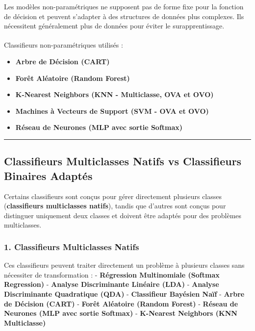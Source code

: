 \documentclass[
  letterpaper,
  DIV=11,
  numbers=noendperiod]{scrartcl}
\makeatletter
\let\oldparagraph\paragraph
\renewcommand{\paragraph}{
    \@ifstar
      \xxxParagraphStar
      \xxxParagraphNoStar
  }
\newcommand{\xxxParagraphStar}[1]{\oldparagraph*{#1}\mbox{}}
\newcommand{\xxxParagraphNoStar}[1]{\oldparagraph{#1}\mbox{}}
\providecommand{\tightlist}{%
  \setlength{\itemsep}{0pt}\setlength{\parskip}{0pt}}\usepackage{longtable,booktabs,array}
\makeatother
\begin{document}
Les modèles non-paramétriques ne supposent pas de forme fixe pour la
fonction de décision et peuvent s'adapter à des structures de données
plus complexes. Ils nécessitent généralement plus de données pour éviter
le surapprentissage.

\paragraph{Classifieurs non-paramétriques utilisés
:}\label{classifieurs-non-paramuxe9triques-utilisuxe9s}

\begin{itemize}
\tightlist
\item
  \textbf{Arbre de Décision (CART)}
\item
  \textbf{Forêt Aléatoire (Random Forest)}
\item
  \textbf{K-Nearest Neighbors (KNN - Multiclasse, OVA et OVO)}
\item
  \textbf{Machines à Vecteurs de Support (SVM - OVA et OVO)}
\item
  \textbf{Réseau de Neurones (MLP avec sortie Softmax)}
\end{itemize}

\begin{center}\rule{0.5\linewidth}{0.5pt}\end{center}

\subsection{Classifieurs Multiclasses Natifs vs Classifieurs Binaires
Adaptés}\label{classifieurs-multiclasses-natifs-vs-classifieurs-binaires-adaptuxe9s}

Certains classifieurs sont conçus pour gérer directement plusieurs
classes (\textbf{classifieurs multiclasses natifs}), tandis que d'autres
sont conçus pour distinguer uniquement deux classes et doivent être
adaptés pour des problèmes multiclasses.

\subsubsection{1. Classifieurs Multiclasses
Natifs}\label{classifieurs-multiclasses-natifs}

Ces classifieurs peuvent traiter directement un problème à plusieurs
classes sans nécessiter de transformation : - \textbf{Régression
Multinomiale (Softmax Regression)} - \textbf{Analyse Discriminante
Linéaire (LDA)} - \textbf{Analyse Discriminante Quadratique (QDA)} -
\textbf{Classifieur Bayésien Naïf} - \textbf{Arbre de Décision (CART)} -
\textbf{Forêt Aléatoire (Random Forest)} - \textbf{Réseau de Neurones
(MLP avec sortie Softmax)} - \textbf{K-Nearest Neighbors (KNN
Multiclasse)}
\end{document}

